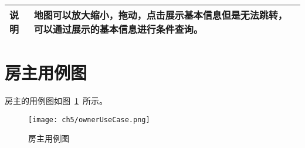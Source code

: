 \begin{table}[htbp]
\begin{tabular}{|l|l|l|l|}
        \hline
        说明                              & \multicolumn{3}{l|}{
        \begin{minipage}[t]{0.8\textwidth}
                地图可以放大缩小，拖动，点击展示基本信息但是无法跳转，可以通过展示的基本信息进行条件查询。
                \vspace{.5em}
            \end{minipage} }                                                                                                                                                                                     \\
        \hline
    \end{tabular}
\end{table}
\section{房主用例图}

房主的用例图如图~\ref{fig:ownerUseCase}~所示。

\begin{figure}[htbp]
    \centering
    \texttt{[image: ch5/ownerUseCase.png]}
    \caption{房主用例图}\label{fig:ownerUseCase}
    \vspace{\baselineskip} %
\end{figure}

